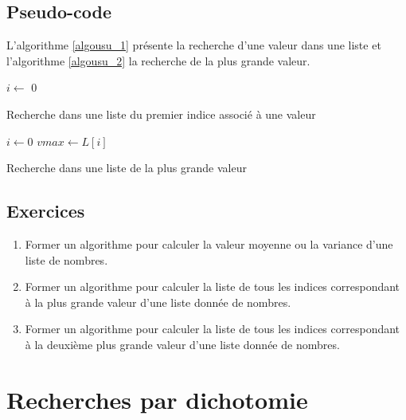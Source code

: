 \subsection{Pseudo-code}
L'algorithme \ref{algousu_1} présente la recherche d'une valeur dans une liste et l'algorithme \ref{algousu_2} la recherche de la plus grande valeur. 
\begin{algorithm}
  $i\leftarrow$ 0 \;
  \caption{Recherche dans une liste du premier indice associé à une valeur}
  \label{algousu_1}
\end{algorithm}
\begin{algorithm}
  $i \leftarrow 0$\;
  $vmax\leftarrow L[i]$  \;
  \caption{Recherche dans une liste de la plus grande valeur}
  \label{algousu_2}
\end{algorithm}


\subsection{Exercices}
\begin{enumerate}
  \item Former un algorithme pour calculer la valeur moyenne ou la variance d'une liste de nombres.
  \item Former un algorithme pour calculer la liste de tous les indices correspondant à la plus grande valeur d'une liste donnée de nombres.
  \item Former un algorithme pour calculer la liste de tous les indices correspondant à la deuxième plus grande valeur d'une liste donnée de nombres.
\end{enumerate}

\section{Recherches par dichotomie}
